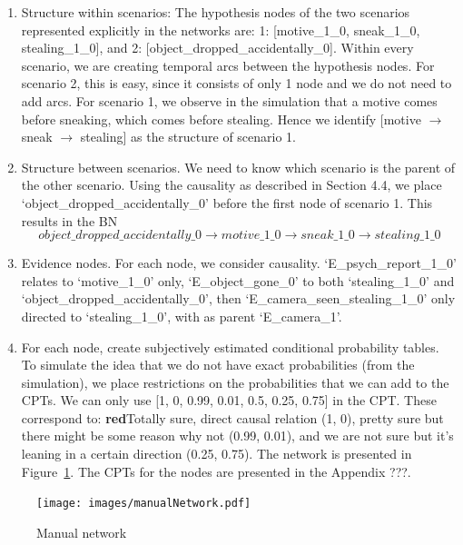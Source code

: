 \documentclass[12pt]{article}
\begin{document}
 \begin{enumerate} 
 
\item Structure within scenarios: The hypothesis nodes of the two scenarios represented explicitly in the networks are: 1: [motive\_1\_0, sneak\_1\_0, stealing\_1\_0], and 2: [object\_dropped\_accidentally\_0]. Within every scenario, we are creating temporal arcs between the hypothesis nodes. For scenario 2, this is easy, since it consists of only 1 node and we do not need to add arcs. For scenario 1, we observe in the simulation that a motive comes before sneaking, which comes before stealing. Hence we identify [motive $\rightarrow$ sneak $\rightarrow$ stealing] as the structure of scenario 1.

\item Structure between scenarios. We need to know which scenario is the parent of the other scenario. Using the causality as described in Section 4.4, we place `object\_dropped\_accidentally\_0' before the first node of scenario 1. This results in the BN \[object\_dropped\_accidentally\_0 \rightarrow motive\_1\_0 \rightarrow sneak\_1\_0 \rightarrow stealing\_1\_0\]

\item Evidence nodes. For each node, we consider causality. `E\_psych\_report\_1\_0' relates to `motive\_1\_0' only, `E\_object\_gone\_0' to both `stealing\_1\_0' and `object\_dropped\_accidentally\_0', then `E\_camera\_seen\_stealing\_1\_0' only directed to `stealing\_1\_0', with as parent `E\_camera\_1'. 

\item For each node, create subjectively estimated conditional probability tables. To simulate the idea that we do not have exact probabilities (from the simulation), we place restrictions on the probabilities that we can add to the CPTs. We can only use [1, 0, 0.99, 0.01, 0.5, 0.25, 0.75] in the CPT. These correspond to: \textbf{red}{Totally sure, direct causal relation (1, 0), pretty sure but there might be some reason why not (0.99, 0.01), and we are not sure but it's leaning in a certain direction (0.25, 0.75)}. The network is presented in Figure~\ref{hebben}. The CPTs for the nodes are presented in the Appendix ???.
 
 \end{enumerate}
 
 
\begin{figure}[htbp]
\begin{center}
\texttt{[image: images/manualNetwork.pdf]}
\caption{Manual network}
\label{hebben}
\end{center}
\end{figure}
\end{document}
